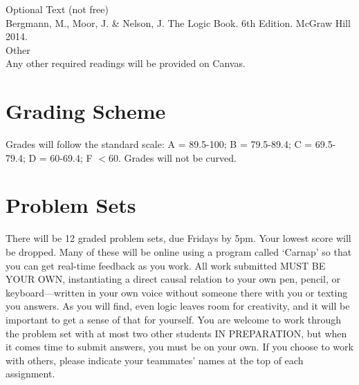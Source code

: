 \documentclass[letterpaper]{inzane_syllabus} %
\begin{document}
{\color{myCOLOR} Optional Text (not free)}\\
Bergmann, M., Moor, J. \& Nelson, J. The Logic Book. 6th Edition. McGraw Hill 2014. \\

{\color{myCOLOR} Other}\\
Any other required readings will be provided on Canvas.

\vspace{0.5cm}
\section{Grading Scheme}

\begin{twentyshort}
\end{twentyshort}

Grades will follow the standard scale: A = 89.5-100; B = 79.5-89.4; C = 69.5-79.4; D = 60-69.4; F  $<$60. Grades will not be curved.


\vspace{0.5cm}
\section{Problem Sets}

There will be 12 graded problem sets, due Fridays by 5pm.
Your lowest score will be dropped.
Many of these will be online using a program called ‘Carnap’ so that you can get real-time feedback as you work.
All work submitted MUST BE YOUR OWN, instantiating a direct causal relation to your own pen, pencil, or keyboard—written in your own voice without someone there with you or texting you answers.
As you will find, even logic leaves room for creativity, and it will be important to get a sense of that for yourself.
You are welcome to work through the problem set with at most two other students IN PREPARATION, but when it comes time to submit answers, you must be on your own.
If you choose to work with others, please indicate your teammates’ names at the top of each assignment.
\end{document}
